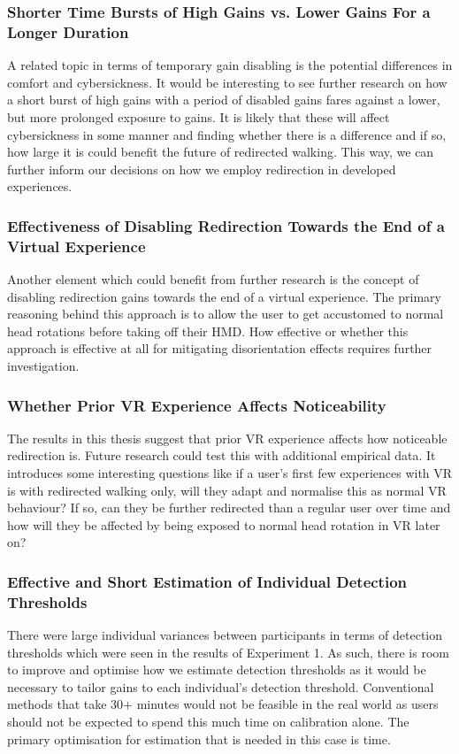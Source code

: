 \subsubsection{Shorter Time Bursts of High Gains vs. Lower Gains For a Longer Duration}
A related topic in terms of temporary gain disabling is the potential differences in comfort and cybersickness. It would be interesting to see further research on how a short burst of high gains with a period of disabled gains fares against a lower, but more prolonged exposure to gains. It is likely that these will affect cybersickness in some manner and finding whether there is a difference and if so, how large it is could benefit the future of redirected walking. This way, we can further inform our decisions on how we employ redirection in developed experiences.

\subsubsection{Effectiveness of Disabling Redirection Towards the End of a Virtual Experience}
Another element which could benefit from further research is the concept of disabling redirection gains towards the end of a virtual experience. The primary reasoning behind this approach is to allow the user to get accustomed to normal head rotations before taking off their HMD. How effective or whether this approach is effective at all for mitigating disorientation effects requires further investigation.
  
\subsubsection{Whether Prior VR Experience Affects Noticeability}
The results in this thesis suggest that prior VR experience affects how noticeable redirection is. Future research could test this with additional empirical data. It introduces some interesting questions like if a user's first few experiences with VR is with redirected walking only, will they adapt and normalise this as normal VR behaviour? If so, can they be further redirected than a regular user over time and how will they be affected by being exposed to normal head rotation in VR later on?

\subsubsection{Effective and Short Estimation of Individual Detection Thresholds}   
There were large individual variances between participants in terms of detection thresholds which were seen in the results of Experiment 1. As such, there is room to improve and optimise how we estimate detection thresholds as it would be necessary to tailor gains to each individual's detection threshold. Conventional methods that take 30+ minutes would not be feasible in the real world as users should not be expected to spend this much time on calibration alone. The primary optimisation for estimation that is needed in this case is time. 

